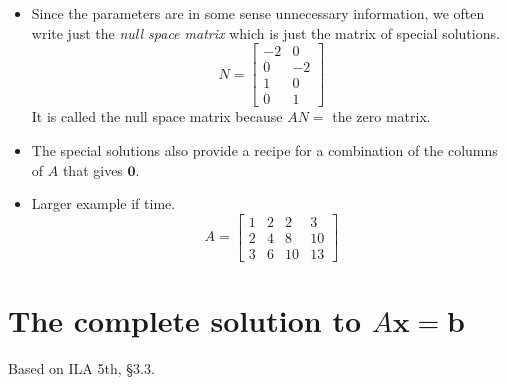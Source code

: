 \documentclass[11pt,oneside]{amsbook}
\theoremstyle{definition}
\theoremstyle{plain}
\theoremstyle{definition}
\theoremstyle{remark}
\numberwithin{equation}{section}
\numberwithin{figure}{section}
\begin{document}
\begin{itemize}
  \[\begin{bmatrix}x\\y\\z\\w\end{bmatrix}
    =\begin{bmatrix}-2\\0\\1\\0\end{bmatrix}z
    +\begin{bmatrix}0\\-2\\0\\1\end{bmatrix}w
  \]
\item Since the parameters are in some sense unnecessary information, we often write just the \emph{null space matrix} which is just the matrix of special solutions.
  \[N=\begin{bmatrix}
      -2&0\\0&-2\\1&0\\0&1
    \end{bmatrix}
  \]
  It is called the null space matrix because $AN=$ the zero matrix.
\item The special solutions also provide a recipe for a combination of the columns of $A$ that gives $\mathbf{0}$.
\item Larger example if time.
  \[A=\begin{bmatrix}
      1&2&2&3\\2&4&8&10\\3&6&10&13
    \end{bmatrix}
  \]
\end{itemize}

\newpage
\section{The complete solution to $A\mathbf{x}=\mathbf{b}$}

Based on ILA 5th, \S 3.3.
\end{document}
